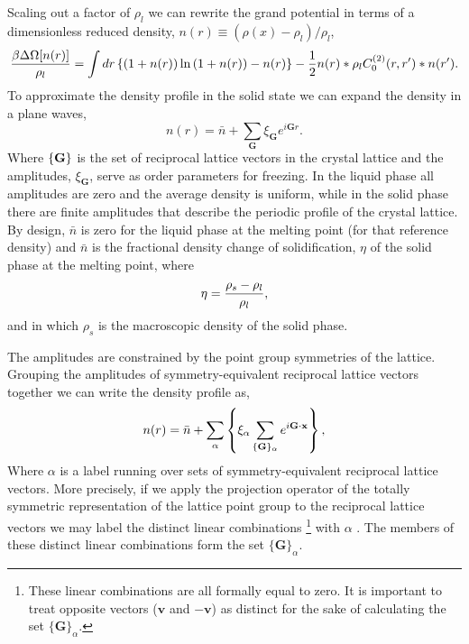 Scaling out a factor of $\rho_l$ we can rewrite the grand potential in terms of
a dimensionless reduced density, $n(r) \equiv (\rho(x) - \rho_l)/\rho_l$,
%
\begin{equation}
    \label{gp}
    \frac{\beta \Delta \Omega[n(r)]}{\rho_l} =
        \int dr \left\lbrace 
            (1 + n(r))\ln\left(1 + n(r)\right) - n(r)\right\rbrace
        - \frac{1}{2} n(r) \ast \rho_l C^{(2)}_0(r, r^\prime) \ast n(r^\prime).
\end{equation}
%
To approximate the density profile in the solid state we can expand the density
in a plane waves,
%
\begin{equation}
    \label{expansion}
    n(r) = \bar{n} + \sum_{\mathbf{G}} \xi_{\mathbf{G}} e^{i \mathbf{G} r}.
\end{equation}
%
Where $\left\lbrace \mathbf{G} \right\rbrace$ is the set of reciprocal lattice
vectors in the crystal lattice and the amplitudes, $\xi_\mathbf{G}$, serve as
order parameters for freezing. In the liquid phase all amplitudes are zero and
the average density is uniform, while in the solid phase there are finite
amplitudes that describe the periodic profile of the crystal lattice. By
design, $\bar{n}$ is zero for the liquid phase at the melting point (for that
reference density) and $\bar{n}$ is the fractional density change of
solidification, $\eta$ of the solid phase at the melting point, where
%
\begin{equation}
    \label{eq:eta_def} 
    \eta = \frac{\rho_s - \rho_l}{\rho_l},
\end{equation}
%
and in which $\rho_s$ is the macroscopic density of the solid phase.

The amplitudes are constrained by the point group symmetries of the lattice.
Grouping the amplitudes of symmetry-equivalent reciprocal lattice vectors
together we can write the density profile as,
%
\begin{equation}
    \label{amplitudes}
    n(r) = \bar{n}
         + \sum_\alpha \left\lbrace
            \xi_\alpha \sum_{\lbrace\mathbf{G}\rbrace_\alpha}
                e^{i\mathbf{G} \cdot \mathbf{x}}\right\rbrace,
\end{equation}
%
Where $\alpha$ is a label running over sets of symmetry-equivalent reciprocal
lattice vectors. More precisely, if we apply the projection operator of the
totally symmetric representation of the lattice point group to the reciprocal
lattice vectors we may label the distinct linear combinations
\footnote{These linear combinations are all formally equal to zero. It is
important to treat opposite vectors ($\mathbf{v}$ and $-\mathbf{v}$) as
distinct for the sake of calculating the set
$\lbrace\mathbf{G}\rbrace_\alpha$.} with $\alpha$ \cite{KIM99}. The members of
these distinct linear combinations form the set
$\lbrace\mathbf{G}\rbrace_\alpha$.

